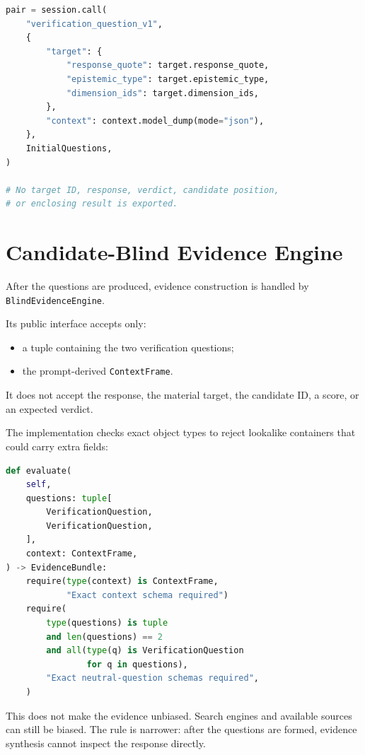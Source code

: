 \begin{lstlisting}[language=Python,caption={Question construction from src/cultverify/targets.py.}]
pair = session.call(
    "verification_question_v1",
    {
        "target": {
            "response_quote": target.response_quote,
            "epistemic_type": target.epistemic_type,
            "dimension_ids": target.dimension_ids,
        },
        "context": context.model_dump(mode="json"),
    },
    InitialQuestions,
)

# No target ID, response, verdict, candidate position,
# or enclosing result is exported.
\end{lstlisting}

\section{Candidate-Blind Evidence Engine}

After the questions are produced, evidence construction is handled by \texttt{BlindEvidenceEngine}.

Its public interface accepts only:

\begin{itemize}
\item a tuple containing the two verification questions;
\item the prompt-derived \texttt{ContextFrame}.
\end{itemize}

It does not accept the response, the material target, the candidate ID, a score, or an expected verdict.

The implementation checks exact object types to reject lookalike containers that could carry extra fields:

\begin{lstlisting}[language=Python,caption={Blind evidence boundary from src/cultverify/evidence.py.}]
def evaluate(
    self,
    questions: tuple[
        VerificationQuestion,
        VerificationQuestion,
    ],
    context: ContextFrame,
) -> EvidenceBundle:
    require(type(context) is ContextFrame,
            "Exact context schema required")
    require(
        type(questions) is tuple
        and len(questions) == 2
        and all(type(q) is VerificationQuestion
                for q in questions),
        "Exact neutral-question schemas required",
    )
\end{lstlisting}

This does not make the evidence unbiased. Search engines and available sources can still be biased. The rule is narrower: after the questions are formed, evidence synthesis cannot inspect the response directly.

